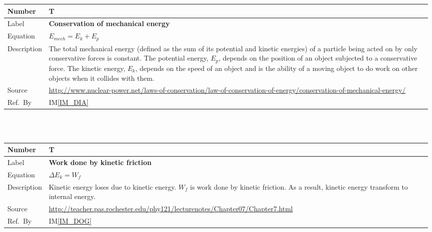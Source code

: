 \documentclass[12pt]{article}
\newcommand{\colAwidth}{0.13\textwidth}
\newcommand{\colBwidth}{0.82\textwidth}
\newcounter{theorynum} %
\newcommand{\iref}[1]{IM\ref{#1}}
\begin{document}
\noindent
\begin{minipage}{\textwidth}
	\renewcommand*{\arraystretch}{1.5}
	\begin{tabular}{| p{\colAwidth} | p{\colBwidth}|}
		\hline
		\rowcolor[gray]{0.9}
		Number& T{theorynum}\thetheorynum \label{T_CME}\\
		\hline
		Label&\bf Conservation of mechanical energy\\
		\hline
		Equation&  $E_{mech}=E_{k}+E_{p}$\\
		\hline
		
		Description & 
		The total mechanical energy (defined as the sum of its potential and kinetic energies) of a particle being acted on by only conservative forces is constant. The potential energy, $E_{p}$, depends on the position of an object subjected to a conservative force. The kinetic energy, $E_{k}$, depends on the speed of an object and is the ability of a moving object to do work on other objects when it collides with them.\\
		\hline
		Source &
		\url{http://www.nuclear-power.net/laws-of-conservation/law-of-conservation-of-energy/conservation-of-mechanical-energy/}\\
		\hline
		Ref.\ By & \iref{IM_DIA}\\
		\hline
\end{tabular}
\end{minipage}\\

~\newline

\noindent
\begin{minipage}{\textwidth}
	\renewcommand*{\arraystretch}{1.5}
	\begin{tabular}{| p{\colAwidth} | p{\colBwidth}|}
		\hline
		\rowcolor[gray]{0.9}
		Number& T{theorynum}\thetheorynum \label{T_WKF}\\
		\hline
		Label&\bf Work done by kinetic friction\\
		\hline
		Equation&  $\Delta E_{k}=W_{f}$\\
		\hline
		
		Description & 
		Kinetic energy loses due to kinetic energy. $W_{f}$ is work done by kinetic friction. As a result, kinetic energy transform to internal energy.\\
		\hline
		Source &
		\url{http://teacher.pas.rochester.edu/phy121/lecturenotes/Chapter07/Chapter7.html}\\
		\hline
		Ref.\ By & \iref{IM_DOG}\\
		\hline
	\end{tabular}
\end{minipage}\\
\end{document}

